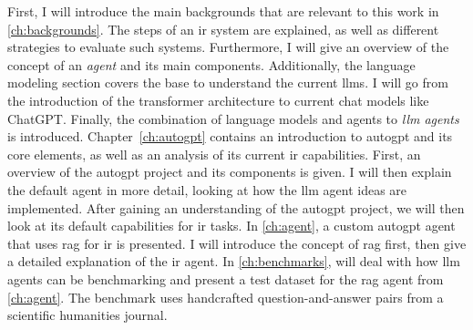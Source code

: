 \documentclass[../main.tex]{subfiles}
\begin{document}
First, I will introduce the main backgrounds
that are relevant to this work in \autoref{ch:backgrounds}.
The steps of an \gls{ir} system are explained, as well
as different strategies to evaluate such systems.
Furthermore, I will give an overview of the concept of an \emph{agent} and its main components.
Additionally, the language modeling section covers the base
to understand the current \glspl{llm}.
I will go from the introduction of the transformer architecture to current chat models like ChatGPT.
Finally, the combination of language models and agents to \emph{\gls{llm} agents} is introduced.
Chapter~\ref{ch:autogpt} contains an introduction to \gls{autogpt} and its core elements,
as well as an analysis of its current \gls{ir} capabilities.
First, an overview of the \gls{autogpt} project and its components is given.
I will then explain the default agent in more detail,
looking at how the \gls{llm} agent ideas are implemented.
After gaining an understanding of the \gls{autogpt} project,
we will then look at its default capabilities for \gls{ir} tasks.
In \autoref{ch:agent},
a custom \gls{autogpt} agent that uses \gls{rag} for \gls{ir} is presented.
I will introduce the concept of \gls{rag} first, then give a detailed explanation
of the \gls{ir} agent.
In \autoref{ch:benchmarks}, will deal with how \gls{llm} agents can be benchmarking
and present a test dataset for the \gls{rag} agent from \autoref{ch:agent}.
The benchmark uses handcrafted question-and-answer pairs from a scientific humanities journal.
\end{document}
